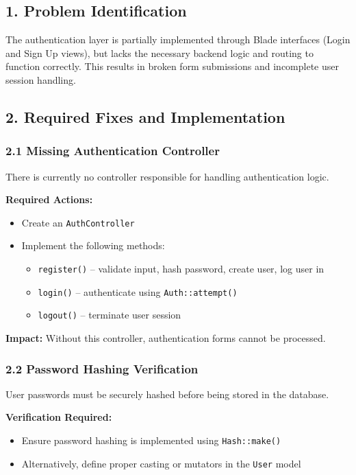 \documentclass[12pt,a4paper]{article}
\begin{document}
\subsection{1. Problem Identification}

The authentication layer is partially implemented through Blade interfaces (Login and Sign Up views), but lacks the necessary backend logic and routing to function correctly. This results in broken form submissions and incomplete user session handling.

\subsection{2. Required Fixes and Implementation}

\subsubsection{2.1 Missing Authentication Controller}

There is currently no controller responsible for handling authentication logic.

\textbf{Required Actions:}
\begin{itemize}[noitemsep]
    \item Create an \texttt{AuthController}
    \item Implement the following methods:
    \begin{itemize}
        \item \texttt{register()} – validate input, hash password, create user, log user in
        \item \texttt{login()} – authenticate using \texttt{Auth::attempt()}
        \item \texttt{logout()} – terminate user session
    \end{itemize}
\end{itemize}

\textbf{Impact:} Without this controller, authentication forms cannot be processed.

\subsubsection{2.2 Password Hashing Verification}

User passwords must be securely hashed before being stored in the database.

\textbf{Verification Required:}
\begin{itemize}[noitemsep]
    \item Ensure password hashing is implemented using \texttt{Hash::make()}
    \item Alternatively, define proper casting or mutators in the \texttt{User} model
\end{itemize}
\end{document}
